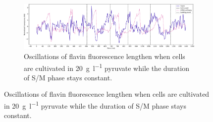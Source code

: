 \begin{figure}
  \centering
  \begin{subfigure}[htpb]{1.0\textwidth}
   \centering
   \includegraphics[width=\textwidth]{pyruvate_single_birth_plot_edit.pdf}
   \caption{
     Oscillations of flavin fluorescence lengthen when cells are cultivated in \SI{20}{\gram~\litre^{-1}} pyruvate while the duration of S/M phase stays constant.
   }
   \label{fig:biology-pyruvate-single}


\end{subfigure}
\end{figure}
